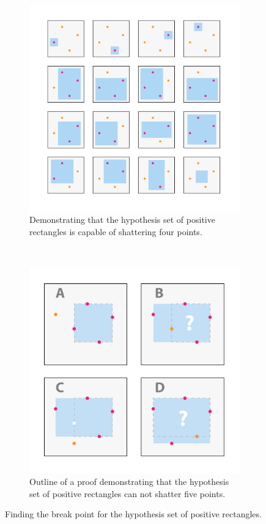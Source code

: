 \documentclass[11pt,letterpaper]{article}
\begin{document}
\begin{figure}
    \centering
    \begin{subfigure}[b]{0.48\textwidth}
        \centering
        \includegraphics[width=\textwidth]{problem_2_2_a.pdf}
        \caption{Demonstrating that the hypothesis set of positive rectangles is capable of shattering four points.}
        \label{fig:p2_2_1}
    \end{subfigure}%
    ~
    \begin{subfigure}[b]{0.48\textwidth}
        \centering
        \includegraphics[width=\textwidth]{problem_2_2_b.pdf}
        \caption{Outline of a proof demonstrating that the hypothesis set of positive rectangles can not shatter five points.}
        \label{fig:p2_2_2}
    \end{subfigure}
    \caption{Finding the break point for the hypothesis set of positive rectangles.}
    \label{fig:p2_2}
\end{figure}
\end{document}
